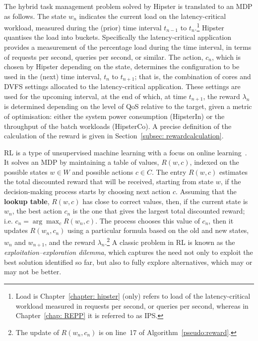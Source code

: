 






The hybrid task management problem solved by Hipster is translated to an MDP as follows.
The state $w_n$ indicates the current load on the latency-critical workload, measured during the (prior) time interval
$t_{n-1}$ to $t_n$.\footnote{Load is Chapter~\ref{chapter: hipster} (only)
refers to load of the latency-critical workload measured in requests per second, or
queries per second, whereas in Chapter~\ref{chap: REPP} it is referred to as IPS.} Hipster quantises the load into buckets.  Specifically the
latency-critical application provides a measurement of the percentage load during the time
interval, in terms of requests per second, queries per second, or similar. The action,
$c_n$, which is chosen by Hipster depending on the state, determines the configuration to
be used in the (next) time interval, $t_n$ to $t_{n+1}$; that is, the combination of cores
and DVFS settings allocated to the latency-critical application.  These settings are used
for the upcoming interval, at the end of which, at time $t_{n+1}$, the reward $\lambda_n$ is
determined depending on the level of QoS relative to the target, given a metric of
optimisation: either the system power consumption (HipsterIn) or the throughput of the
batch workloads (HipsterCo). A precise definition of the calculation of the reward is
given in Section~\ref{subsec: rewardcalculation}.


RL is a type of unsupervised machine learning with a focus on online
learning~\citep{Mnih2015Human-levelLearning}. It solves an MDP by maintaining a table of
values, $R(w,c)$, indexed on the possible states $w\in W$ and possible actions $c\in C$.
The entry $R(w,c)$ estimates the total discounted reward that will be received, starting
from state $w$, if the decision-making process starts by choosing next action $c$.
Assuming that the \textbf{lookup table}, $R(w,c)$ has close to correct values, then, if
the current state is $w_n$, the best action $c_n$ is the one that gives the largest total
discounted reward; i.e. $c_n = \arg\max_c R(w_n, c)$.  The process chooses this value of
$c_n$, then it updates $R(w_n, c_n)$ using a particular formula based on the old and new
states, $w_n$ and $w_{n+1}$, and the reward $\lambda_n$.\footnote{The update of
$R(w_n,c_n)$ is on line~17 of Algorithm~\ref{pseudo:reward}.} A classic problem in RL is
known as the \textit{exploitation--exploration dilemma}, which captures the need not only
to exploit the best solution identified so far, but also to fully explore alternatives,
which may or may not be better.  

